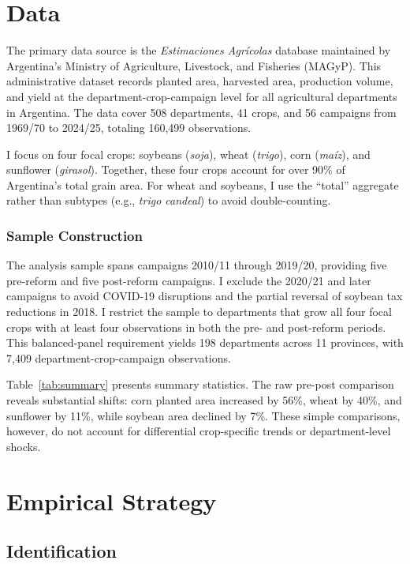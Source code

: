 \documentclass[12pt]{article}
\begin{document}
\section{Data}
\label{sec:data}

The primary data source is the \textit{Estimaciones Agrícolas} database maintained by Argentina's Ministry of Agriculture, Livestock, and Fisheries (MAGyP). This administrative dataset records planted area, harvested area, production volume, and yield at the department-crop-campaign level for all agricultural departments in Argentina. The data cover 508 departments, 41 crops, and 56 campaigns from 1969/70 to 2024/25, totaling 160,499 observations.

I focus on four focal crops: soybeans (\textit{soja}), wheat (\textit{trigo}), corn (\textit{maíz}), and sunflower (\textit{girasol}). Together, these four crops account for over 90\% of Argentina's total grain area. For wheat and soybeans, I use the ``total'' aggregate rather than subtypes (e.g., \textit{trigo candeal}) to avoid double-counting.

\subsubsection*{Sample Construction} The analysis sample spans campaigns 2010/11 through 2019/20, providing five pre-reform and five post-reform campaigns. I exclude the 2020/21 and later campaigns to avoid COVID-19 disruptions and the partial reversal of soybean tax reductions in 2018. I restrict the sample to departments that grow all four focal crops with at least four observations in both the pre- and post-reform periods. This balanced-panel requirement yields 198 departments across 11 provinces, with 7,409 department-crop-campaign observations.



Table~\ref{tab:summary} presents summary statistics. The raw pre-post comparison reveals substantial shifts: corn planted area increased by 56\%, wheat by 40\%, and sunflower by 11\%, while soybean area declined by 7\%. These simple comparisons, however, do not account for differential crop-specific trends or department-level shocks.


\section{Empirical Strategy}
\label{sec:strategy}

\subsection{Identification}
\end{document}
